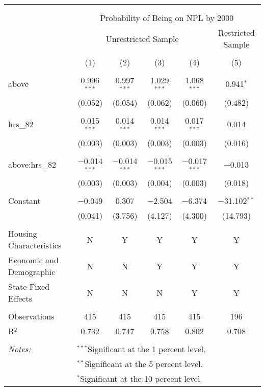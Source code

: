 
\begin{table}[!htbp] \centering 
  \caption{} 
  \label{} 
\begin{tabular}{@{\extracolsep{5pt}}lccccc} 
\\[-1.8ex]\hline 
\hline \\[-1.8ex] 
\\[-1.8ex] & \multicolumn{5}{c}{Probability of Being on NPL by 2000} \\ 
 & \multicolumn{4}{c}{Unrestricted Sample} & Restricted Sample \\ 
\\[-1.8ex] & (1) & (2) & (3) & (4) & (5)\\ 
\hline \\[-1.8ex] 
 above & 0.996$^{***}$ & 0.997$^{***}$ & 1.029$^{***}$ & 1.068$^{***}$ & 0.941$^{*}$ \\ 
  & (0.052) & (0.054) & (0.062) & (0.060) & (0.482) \\ 
  & & & & & \\ 
 hrs\_82 & 0.015$^{***}$ & 0.014$^{***}$ & 0.014$^{***}$ & 0.017$^{***}$ & 0.014 \\ 
  & (0.003) & (0.003) & (0.003) & (0.003) & (0.016) \\ 
  & & & & & \\ 
 above:hrs\_82 & $-$0.014$^{***}$ & $-$0.014$^{***}$ & $-$0.015$^{***}$ & $-$0.017$^{***}$ & $-$0.013 \\ 
  & (0.003) & (0.003) & (0.004) & (0.003) & (0.018) \\ 
  & & & & & \\ 
 Constant & $-$0.049 & 0.307 & $-$2.504 & $-$6.374 & $-$31.102$^{**}$ \\ 
  & (0.041) & (3.756) & (4.127) & (4.300) & (14.793) \\ 
  & & & & & \\ 
Housing Characteristics & N & Y & Y & Y & Y \\ 
Economic and Demographic & N & N & Y & Y & Y \\ 
State Fixed Effects & N & N & N & Y & Y \\ 
 &  &  &  &  &  \\ 
Observations & 415 & 415 & 415 & 415 & 196 \\ 
R$^{2}$ & 0.732 & 0.747 & 0.758 & 0.802 & 0.708 \\ 
\hline \\[-1.8ex] 
\textit{Notes:} & \multicolumn{5}{l}{$^{***}$Significant at the 1 percent level.} \\ 
 & \multicolumn{5}{l}{$^{**}$Significant at the 5 percent level.} \\ 
 & \multicolumn{5}{l}{$^{*}$Significant at the 10 percent level.} \\ 
\end{tabular} 
\end{table} 
